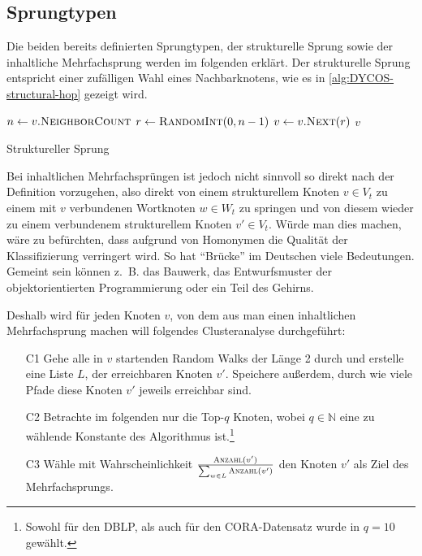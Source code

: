 \subsection{Sprungtypen}\label{sec:sprungtypen}
Die beiden bereits definierten Sprungtypen, der strukturelle Sprung
sowie der inhaltliche Mehrfachsprung werden im folgenden erklärt.
\goodbreak
Der strukturelle Sprung entspricht einer zufälligen Wahl eines 
Nachbarknotens, wie es in \cref{alg:DYCOS-structural-hop}
gezeigt wird.
\begin{algorithm}[H]
    \begin{algorithmic}[1]
            \State $n \gets v.\Call{NeighborCount}{}$ 
            \State $r \gets \Call{RandomInt}{0, n-1}$ 
            \State $v \gets v.\Call{Next}{r}$ 
            \State \Return $v$
        \EndProcedure
    \end{algorithmic}
\caption{Struktureller Sprung}
\label{alg:DYCOS-structural-hop}
\end{algorithm}

Bei inhaltlichen Mehrfachsprüngen ist jedoch nicht sinnvoll so direkt
nach der Definition vorzugehen,  also
direkt von einem strukturellem Knoten 
$v \in V_t$ zu einem mit $v$ verbundenen Wortknoten $w \in W_t$ zu springen
und von diesem wieder zu einem verbundenem strukturellem Knoten 
$v' \in V_t$. Würde man dies machen, wäre zu befürchten, dass
aufgrund von Homonymen die Qualität der Klassifizierung verringert
wird. So hat \enquote{Brücke} im Deutschen viele Bedeutungen.
Gemeint sein können z.~B. das Bauwerk, das Entwurfsmuster der
objektorientierten Programmierung oder ein Teil des Gehirns.

Deshalb wird für jeden Knoten $v$, von dem aus man einen inhaltlichen
Mehrfachsprung machen will folgendes Clusteranalyse durchgeführt:
\begin{enumerate}[label=C\arabic*),ref=C\arabic*]
    \item[C1] Gehe alle in $v$ startenden Random Walks der Länge 2 durch
          und erstelle eine Liste $L$, der erreichbaren Knoten $v'$. Speichere
          außerdem, durch wie viele Pfade diese Knoten $v'$ jeweils erreichbar sind.
    \item[C2] Betrachte im folgenden nur die Top-$q$ Knoten, wobei $q \in \mathbb{N}$
          eine zu wählende Konstante des Algorithmus ist.\footnote{Sowohl für den DBLP, als auch für den 
CORA-Datensatz wurde in \cite[S. 364]{aggarwal2011} $q=10$ gewählt.} \label{list:aggregate.2}
    \item[C3] Wähle mit Wahrscheinlichkeit $\frac{\Call{Anzahl}{v'}}{\sum_{w \in L} \Call{Anzahl}{v'}}$
          den Knoten $v'$ als Ziel des Mehrfachsprungs.
\end{enumerate}

